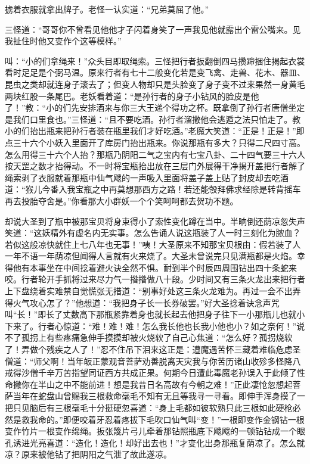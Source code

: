 \documentclass[12pt,UTF8]{ctexbook}
\begin{document}
掳着衣服就拿出牌子。老怪一认实道：“兄弟莫屈了他。”

三怪道：“哥哥你不曾看见他他才子闪着身笑了一声我见他就露出个雷公嘴来。见我扯住时他又变作个这等模样。”

叫：“小的们拿绳来！”众头目即取绳索。三怪把行者扳翻倒四马攒蹄捆住揭起衣裳看时足足是个弼马温。原来行者有七十二般变化若是变飞禽、走兽、花木、器皿、昆虫之类却就连身子滚去了；但变人物却只是头脸变了身子变不过来果然一身黄毛两块红股一条尾巴。老妖看着道：“是孙行者的身子小钻风的脸皮是他了！”教：“小的们先安排酒来与你三大王递个得功之杯。既拿倒了孙行者唐僧坐定是我们口里食也。”三怪道：“且不要吃酒。孙行者溜撒他会逃遁之法只怕走了。教小的们抬出瓶来把孙行者装在瓶里我们才好吃酒。”老魔大笑道：“正是！正是！”即点三十六个小妖入里面开了库房门抬出瓶来。你说那瓶有多大？只得二尺四寸高。怎么用得三十六个人抬？那瓶乃阴阳二气之宝内有七宝八卦、二十四气要三十六人按天罡之数才抬得动。不一时将宝瓶抬出放在三层门外展得干净揭开盖把行者解了绳索剥了衣服就着那瓶中仙气飕的一声吸入里面将盖子盖上贴了封皮却去吃酒道：“猴儿今番入我宝瓶之中再莫想那西方之路！若还能彀拜佛求经除是转背摇车再去投胎夺舍是。”你看那大小群妖一个个笑呵呵都去贺功不题。

却说大圣到了瓶中被那宝贝将身束得小了索性变化蹲在当中。半晌倒还荫凉忽失声笑道：“这妖精外有虚名内无实事。怎么告诵人说这瓶装了人一时三刻化为脓血？若似这般凉快就住上七八年也无事！”咦！大圣原来不知那宝贝根由：假若装了人一年不语一年荫凉但闻得人言就有火来烧了。大圣未曾说完只见满瓶都是火焰。幸得他有本事坐在中间捻着避火诀全然不惧。耐到半个时辰四周围钻出四十条蛇来咬。行者轮开手抓将过来尽力气一揝揝做八十段。少时间又有三条火龙出来把行者上下盘绕着实难禁自觉慌张无措道：“别事好处这三条火龙难为。再过一会不出弄得火气攻心怎了？”他想道：“我把身子长一长券破罢。”好大圣捻着诀念声咒叫“长！”即长了丈数高下那瓶紧靠着身也就长起去他把身子往下一小那瓶儿也就小下来了。行者心惊道：“难！难！难！怎么我长他也长我小他也小？如之奈何！”说不了孤拐上有些疼痛急伸手摸摸却被火烧软了自己心焦道：“怎么好？孤拐烧软了！弄做个残疾之人了！”忍不住吊下泪来这正是：遭魔遇苦怀三藏着难临危虑圣僧道：“师父啊！当年皈正蒙观音菩萨劝善脱离天灾我与你苦历诸山收殄多怪降八戒得沙僧千辛万苦指望同证西方共成正果。何期今日遭此毒魔老孙误入于此倾了性命撇你在半山之中不能前进！想是我昔日名高故有今朝之难！”正此凄怆忽想起菩萨当年在蛇盘山曾赐我三根救命毫毛不知有无且等我寻一寻看。即伸手浑身摸了一把只见脑后有三根毫毛十分挺硬忽喜道：“身上毛都如彼软熟只此三根如此硬枪必然是救我命的。”即便咬着牙忍着疼拔下毛吹口仙气叫“变！”一根即变作金钢钻一根变作竹片一根变作绵绳。扳张篾片弓儿牵着那钻照瓶底下飕飕的一顿钻钻成一个眼孔诱进光亮喜道：“造化！造化！却好出去也！”才变化出身那瓶复荫凉了。怎么就凉？原来被他钻了把阴阳之气泄了故此遂凉。
\end{document}
